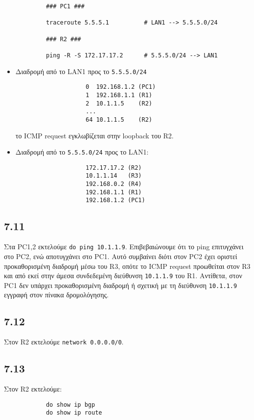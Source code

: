 \documentclass[a4paper, 12pt]{article}
\begin{document}
		\begin{verbatim}
			### PC1 ###
			
			traceroute 5.5.5.1          # LAN1 --> 5.5.5.0/24
			
			### R2 ###
			
			ping -R -S 172.17.17.2      # 5.5.5.0/24 --> LAN1
		\end{verbatim}
		
		\begin{itemize}
			\item Διαδρομή από το LAN1 προς το \verb|5.5.5.0/24|
				\begin{verbatim}
					0  192.168.1.2 (PC1)
					1  192.168.1.1 (R1)
					2  10.1.1.5    (R2)
					...
					64 10.1.1.5    (R2)
				\end{verbatim}
				
				το ICMP request εγκλωβίζεται στην loopback του R2.
			
			\item Διαδρομή από το \verb|5.5.5.0/24| προς το LAN1: 
				\begin{verbatim}
					172.17.17.2 (R2)
					10.1.1.14   (R3)
					192.168.0.2 (R4)
					192.168.1.1 (R1)
					192.168.1.2 (PC1)
				\end{verbatim}
		\end{itemize}

	\subsection*{7.11}
		Στα PC1,2 εκτελούμε \verb|do ping 10.1.1.9|. Επιβεβαιώνουμε ότι το ping επιτυγχάνει στο PC2, ενώ αποτυγχάνει στο PC1. Αυτό συμβαίνει διότι στον PC2 έχει οριστεί προκαθορισμένη διαδρομή μέσω του R3, οπότε το ICMP request προωθείται στον R3 και από εκεί στην άμεσα συνδεδεμένη διεύθυνση \verb|10.1.1.9| του R1. Αντίθετα, στον PC1 δεν υπάρχει προκαθορισμένη διαδρομή ή σχετική με τη διεύθυνση \verb|10.1.1.9| εγγραφή στον πίνακα δρομολόγησης. 

	\subsection*{7.12}
		Στον R2 εκτελούμε \verb|network 0.0.0.0/0|.

	\subsection*{7.13}
		Στον R2 εκτελούμε:
		
		\begin{verbatim}
			do show ip bgp
			do show ip route
		\end{verbatim}
		
\end{document}
